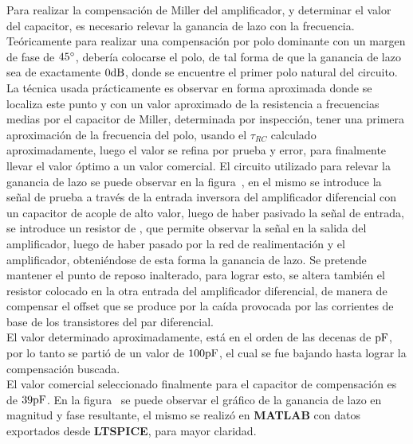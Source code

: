 
\label{sect:compensation}

Para realizar la compensación de Miller del amplificador, y determinar el valor del capacitor, es necesario relevar la ganancia de lazo con la frecuencia. Teóricamente para realizar una compensación por polo dominante con un margen de fase de $45 \si[per-mode=symbol]{\degree}$, debería colocarse el polo, de tal forma de que la ganancia de lazo sea de exactamente $0 \si[per-mode=symbol]{\decibel}$, donde se encuentre el primer polo natural del circuito. La técnica usada prácticamente es observar en forma aproximada donde se localiza este punto y con un valor aproximado de la resistencia a frecuencias medias  por el capacitor de Miller, determinada por inspección, tener una primera aproximación de la frecuencia del polo, usando el $\tau_{RC}$ calculado aproximadamente, luego el valor se refina por prueba y error, para finalmente llevar el valor óptimo a un valor comercial. El circuito utilizado para relevar la ganancia de lazo se puede observar en la figura~, en el mismo se introduce la señal de prueba a través de la entrada inversora del amplificador diferencial con un capacitor de acople de alto valor, luego de haber pasivado la señal de entrada, se introduce un resistor de , que permite observar la señal en la salida del amplificador, luego de haber pasado por la red de realimentación y el amplificador, obteniéndose de esta forma la ganancia de lazo. Se pretende mantener el punto de reposo inalterado, para lograr esto, se altera también el resistor colocado en la otra entrada del amplificador diferencial, de manera de compensar el offset que se produce por la caída provocada por las corrientes de base de los transistores del par diferencial.\\

El valor determinado aproximadamente, está en el orden de las decenas de $\si[per-mode=symbol]{\pico\farad}$, por lo tanto se partió de un valor de $100 \si[per-mode=symbol]{\pico\farad}$, el cual se fue bajando hasta lograr la compensación buscada. \\

El valor comercial seleccionado finalmente para el capacitor de compensación es de  $39 \si[per-mode=symbol]{\pico\farad}$. En la figura~ se puede observar el gráfico de la ganancia de lazo en magnitud y fase resultante, el mismo se realizó en \textbf{MATLAB} con datos exportados desde \textbf{LTSPICE}, para mayor claridad. \\

